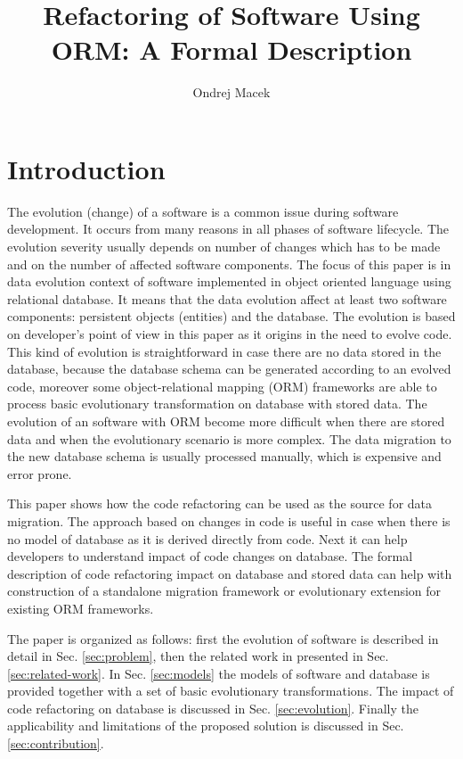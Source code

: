 \documentclass[11pt]{article}
\title{Refactoring of Software Using ORM: A Formal Description}
\author{Ondrej Macek}
\begin{document}
\maketitle
\section{Introduction}
\label{sec:intro}
The evolution (change) of a software is a common issue during software development. It occurs from many reasons in all phases of software lifecycle. The evolution severity usually depends on number of changes which has to be made and on the number of affected software components. The focus of this paper is in data evolution context of software implemented in object oriented language using relational database. It means that the data evolution affect at least two software components: persistent objects (entities) and the database. The evolution is based on developer's point of view in this paper as it origins in the need to evolve code. This kind of evolution is straightforward in case there are no data stored in the database, because the database schema can be generated according to an evolved code, moreover some object-relational mapping (ORM) frameworks are able to process basic evolutionary transformation on database with stored data. The evolution of an software with ORM become more difficult when there are stored data and when the evolutionary scenario is more complex. The data migration to the new database schema is usually processed manually, which is expensive and error prone.

This paper shows how the code refactoring can be used as the source for data migration. The approach based on changes in code is useful in case when there is no model of database as it is derived directly from code. Next it can help developers to understand impact  of code changes on database. The formal description of code refactoring impact on database and stored data can help with construction of a standalone migration framework or evolutionary extension for existing ORM frameworks.

The paper is organized as follows: first the evolution of software is described in detail in Sec. \ref{sec:problem}, then the related work in presented in Sec. \ref{sec:related-work}. In Sec. \ref{sec:models} the models of software and database is provided together with a set of basic evolutionary transformations. The impact of code refactoring on database is discussed in Sec. \ref{sec:evolution}. Finally the applicability and limitations of the proposed solution is discussed in Sec. \ref{sec:contribution}.
\end{document}
